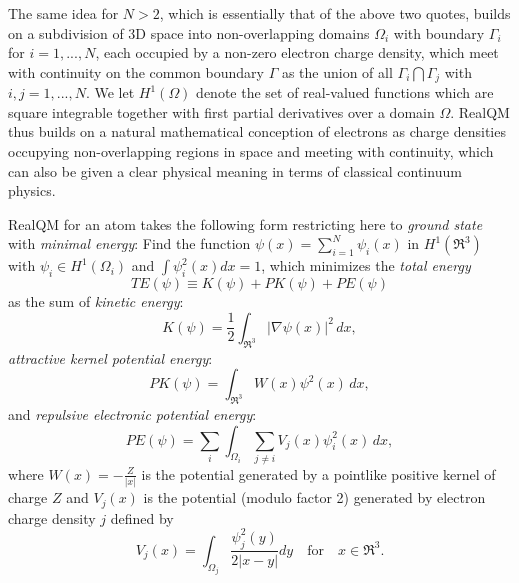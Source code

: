 \documentclass[11pt]{article} %
\begin{document}
The same idea for $N>2$,  which is essentially that of the above two quotes,  builds on a subdivision of 3D space into non-overlapping domains $\Omega_i$ with boundary $\Gamma_i$ for $i=1,...,N$,  each occupied by a non-zero electron charge density,  which meet with continuity on the common boundary $\Gamma $ as the union of all $\Gamma_i\bigcap\Gamma_j$ with $i,j=1,...,N$.  We let $H^1(\Omega )$ denote the set of real-valued functions which are square integrable together with first partial derivatives over a domain $\Omega$.  RealQM thus builds on a natural mathematical conception of electrons as charge densities occupying non-overlapping regions in space and meeting with continuity,  which can also be given a clear physical meaning in terms of classical continuum physics.  

RealQM for an atom takes the following form restricting here to \emph{ground state} with \emph{minimal energy}: Find the function $\psi (x)=\sum_{i=1}^N\psi_i(x)$ in $H^1(\Re^3)$ with $\psi_i\in H^1(\Omega_i )$ and $\int\psi_i^2(x)dx=1$,  which minimizes the \emph{total energy} 
\begin{displaymath}
TE(\psi )\equiv K(\psi )+PK(\psi )+PE(\psi )
\end{displaymath}
as the sum of \emph{kinetic energy}:
\begin{displaymath}
K(\psi )=\frac{1}{2}\int_{\Re^3}\vert\nabla\psi (x)\vert^2\, dx,
\end{displaymath}
 \emph{attractive kernel potential energy}:
\begin{displaymath}
PK(\psi )=\int_{\Re^3}W(x)\psi^2(x)\, dx,
\end{displaymath}
and \emph{repulsive electronic potential energy}:
\begin{displaymath}
PE(\psi )=\sum_i\int_{\Omega_i}\sum_{j\neq i} V_j(x)\psi_i^2(x)\, dx,
\end{displaymath}    
where $W(x)=-\frac{Z}{\vert x\vert}$ is the potential generated by a pointlike positive kernel of charge $Z$ and $V_j(x)$ is the potential (modulo factor 2) generated by electron charge density $j$ defined by 
\begin{displaymath}
V_j(x)=\int_{\Omega_j}\frac{\psi_j^2(y)}{2\vert x-y\vert}dy \quad\mbox{for}\quad x\in\Re^3.
\end{displaymath}
\end{document}
